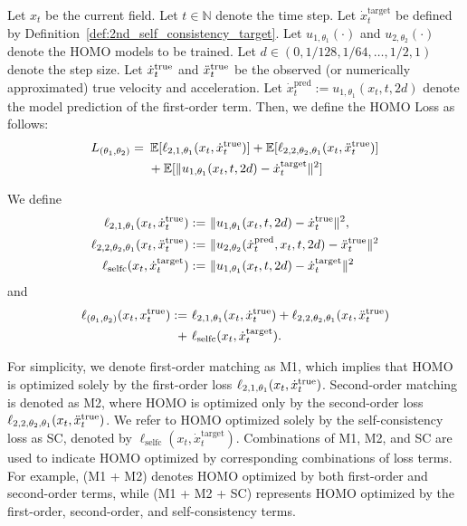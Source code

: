 \begin{definition} 
\label{def:HOMO_loss}
Let $x_t$ be the current field. 
Let $t \in \mathbb{N}$ denote the time step. 
Let $\dot{x}_t^{\mathrm{target}}$ be defined by Definition~\ref{def:2nd_self_consistency_target}.
Let $u_{1,\theta_1}( \cdot )$ and $u_{2,\theta_2}( \cdot )$ denote the HOMO models to be trained. 
Let $d \in (0, 1 / 128, 1 / 64,\dots, 1 / 2, 1 )$ denote the step size. 
Let $\dot{x}_t^{\mathrm{true}}$ and $\ddot{x}_t^{\mathrm{true}}$ be the observed (or numerically approximated) true velocity and acceleration. 
Let $\dot{x}_t^{\mathrm{pred}} := u_{1,\theta_1}(x_t, t, 2 d)$ denote the model prediction of the first-order term.
Then, we define the HOMO Loss as follows: 
\begin{align*}
L_{(\theta_1,\theta_2)} = & ~ \operatorname*{{\mathbb{E}}}[\ell_{2,1,\theta_1}(x_t, \dot{x}_t^{\mathrm{true}})] + \operatorname*{{\mathbb{E}}}[\ell_{2,2,\theta_2, \theta_1}(x_t, \ddot{x}_t^{\mathrm{true}})] \\
& ~ +
\operatorname*{{\mathbb{E}}}[ \| u_{1,\theta_1}(x_t, t, 2 d)- \dot{x}_t^{\mathrm{target}}\|^2]
\end{align*}

We define 
\begin{align*}
    \ell_{2,1,\theta_1}(x_t, \dot{x}_t^{\mathrm{true}}) := &~ \|  u_{1,\theta_1}(x_t, t, 2 d) - \dot{x}_t^{\mathrm{true}} \|^2, \\
    \ell_{2,2,\theta_2, \theta_1}(x_t, \ddot{x}_t^{\mathrm{true}}) := &~ \| u_{2,\theta_2}  (\dot{x}_t^{\mathrm{pred}}, x_t, t, 2 d) - \ddot{x}_t^{\mathrm{true}} \|^2 \\
    \ell_{\mathrm{selfc}}(x_t, \dot{x}_t^{\mathrm{target}}) := &~ \| u_{1,\theta_1}(x_t, t, 2 d)- \dot{x}_t^{\mathrm{target}}\|^2
\end{align*}
and 
\begin{align*}
    \ell_{(\theta_1, \theta_2)}(x_t, x_t^{\mathrm{true}}) := &~ \ell_{2,1,\theta_1}(x_t, \dot{x}_t^{\mathrm{true}})+\ell_{2,2,\theta_2, \theta_1}(x_t, \ddot{x}_t^{\mathrm{true}}) \\ + &~ \ell_{\mathrm{selfc}}(x_t, \dot{x}_t^{\mathrm{target}}).
\end{align*}
\end{definition}

\begin{remark}  \label{rem:simplicity_notations}
For simplicity, we denote first-order matching as M1, which implies that HOMO is optimized solely by the first-order loss $\ell_{2,1,\theta_1}(x_t, \dot{x}_t^{\mathrm{true}})$. Second-order matching is denoted as M2, where HOMO is optimized only by the second-order loss $\ell_{2,2,\theta_2, \theta_1}(x_t, \ddot{x}_t^{\mathrm{true}})$. We refer to HOMO optimized solely by the self-consistency loss as SC, denoted by $\ell_{\mathrm{selfc}}(x_t, \dot{x}_t^{\mathrm{target}})$. Combinations of M1, M2, and SC are used to indicate HOMO optimized by corresponding combinations of loss terms. For example, (M1 + M2) denotes HOMO optimized by both first-order and second-order terms, while (M1 + M2 + SC) represents HOMO optimized by the first-order, second-order, and self-consistency terms.
\end{remark}


